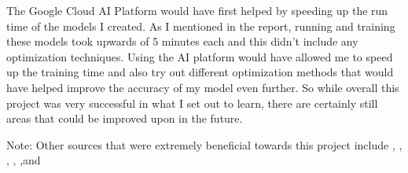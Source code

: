 \documentclass[12pt]{article}
\begin{document}
The Google Cloud AI Platform would have first helped by speeding up the
run time of the models I created. As I mentioned in the report, running
and training these models took upwards of 5 minutes each and this didn't
include any optimization techniques. Using the AI platform would have
allowed me to speed up the training time and also try out different
optimization methods that would have helped improve the accuracy of my
model even further. So while overall this project was very successful in
what I set out to learn, there are certainly still areas that could be
improved upon in the future.

Note: Other sources that were extremely beneficial towards this project
include \citet{PAD}, \citet{Medium}, \citet{CloudStorage},
\citet{Kaggle}, \citet{RPubs},and \citet{Shirin} \newpage



\end{document}

